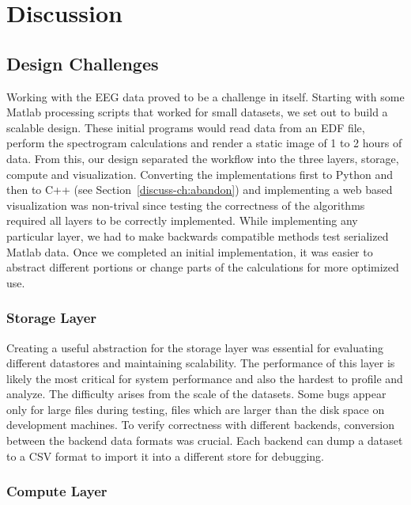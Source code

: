 \chapter{Discussion}\label{discuss-ch}

\section{Design Challenges}

Working with the EEG data proved to be a challenge in itself. Starting with
some Matlab processing scripts that worked for small datasets, we set out to
build a scalable design. These initial programs would read data from an EDF
file, perform the spectrogram calculations and render a static image of 1 to 2
hours of data. From this, our design separated the workflow into the three
layers, storage, compute and visualization. Converting the implementations
first to Python and then to C++ (see Section~\ref{discuss-ch:abandon}) and
implementing a web based visualization was non-trival since testing the
correctness of the algorithms required all layers to be correctly implemented.
While implementing any particular layer, we had to make backwards compatible
methods test serialized Matlab data. Once we completed an initial
implementation, it was easier to abstract different portions or change parts of
the calculations for more optimized use. \\

\subsection{Storage Layer}

Creating a useful abstraction for the storage layer was essential for
evaluating different datastores and maintaining scalability. The performance of
this layer is likely the most critical for system performance and also the
hardest to profile and analyze. The difficulty arises from the scale of the
datasets. Some bugs appear only for large files during testing, files which are
larger than the disk space on development machines. To verify correctness with
different backends, conversion between the backend data formats was crucial.
Each backend can dump a dataset to a CSV format to import it into a different
store for debugging.

\subsection{Compute Layer}

